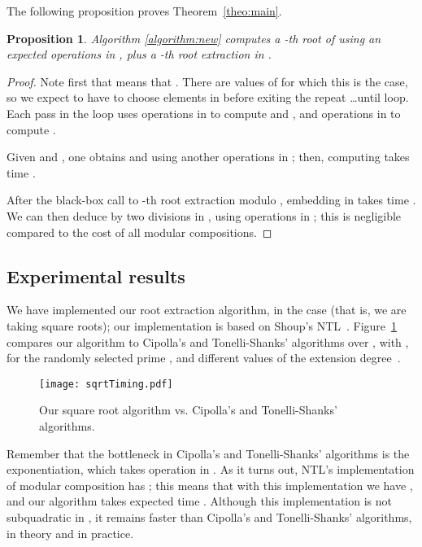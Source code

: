 \documentclass[12pt]{article}
\theoremstyle{plain}
\newtheorem{proposition}[theorem]{Proposition}
\theoremstyle{definition}
\newcommand{\refalgorithm}[1]{Algorithm \ref{#1}}
\newcounter{algorithm}
\begin{document}
The following proposition proves Theorem~\ref{theo:main}.

\begin{proposition}
  \refalgorithm{algorithm:new} computes a -th root of  using an
  expected  operations in ,
  plus a -th root extraction in .
\end{proposition}
\begin{proof}
  Note first that  means that . There are  values of  for which this is the case, so
  we expect to have to choose  elements in  before exiting
  the repeat \dots until loop. Each pass in the loop uses
   operations in  to compute  and
  , and  operations in 
  to compute .

  Given  and , one obtains  and  using another
   operations in ; then, computing  takes
  time . 

  After the black-box call to -th root extraction modulo ,
  embedding  in  takes time . We can then deduce
   by two divisions in , using 
  operations in ; this is negligible compared to the cost of all
  modular compositions.
\end{proof}





\subsection{Experimental results}
We have implemented our root extraction algorithm, in the case 
(that is, we are taking square roots); our implementation is based on
Shoup's NTL~\cite{NTL2009}. Figure~\ref{figure:sqrtTiming} compares
our algorithm to Cipolla's and Tonelli-Shanks' algorithms over ,
with , for the randomly selected prime , and different values of
the extension degree~. 

\begin{figure}[ht]
\begin{center}
\texttt{[image: sqrtTiming.pdf]}
\end{center}
\caption{\small Our square root algorithm vs. Cipolla's and
  Tonelli-Shanks' algorithms.}
\label{figure:sqrtTiming}
\end{figure}

Remember that the bottleneck in Cipolla's and Tonelli-Shanks'
algorithms is the exponentiation, which takes 
operation in . As it turns out, NTL's implementation of modular
composition has ; this means that with this implementation
we have , and our algorithm takes expected time
. Although this implementation is not
subquadratic in , it remains faster than Cipolla's and
Tonelli-Shanks' algorithms, in theory and in practice.
\end{document}
